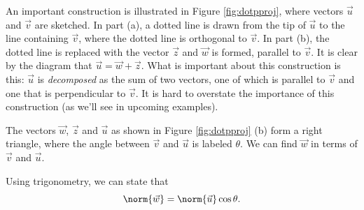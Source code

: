 An important construction is illustrated in Figure \ref{fig:dotpproj}, where vectors $\vec u$ and $\vec v$ are sketched. In part (a), a dotted line is drawn from the tip of $\vec u$ to the line containing $\vec v$, where the dotted line is orthogonal to $\vec v$. In part (b), the dotted line is replaced with the vector $\vec z$ and  $\vec w$ is formed, parallel to $\vec v$. It is clear by the diagram that $\vec u = \vec w+\vec z$. What is important about this construction is this: $\vec u$ is \emph{decomposed} as the sum of two vectors, one of which is parallel to $\vec v$ and one that is perpendicular to $\vec v$. It is hard to overstate the importance of this construction (as we'll see in upcoming examples). 

The vectors $\vec w$, $\vec z$ and $\vec u$ as shown in Figure \ref{fig:dotpproj} (b) form a right triangle, where the angle between $\vec v$ and $\vec u$ is labeled $\theta$. We can find $\vec w$ in terms of $\vec v$ and $\vec u$.

Using trigonometry, we can state that 
\begin{equation}
\norm{\vec w} = \norm{\vec u}\cos \theta. \label{eq:proj1}
\end{equation}

